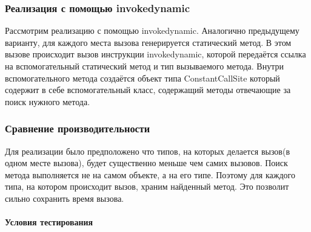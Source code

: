 \subsubsection{Реализация с помощью invokedynamic}
Рассмотрим реализацию с помощью invokedynamic. Аналогично предыдущему варианту, для каждого места вызова генерируется статический метод. В этом вызове происходит вызов инструкции invokedynamic, которой передаётся ссылка на вспомогательный статический метод и тип вызываемого метода. Внутри вспомогательного метода создаётся объект типа ConstantCallSite который содержит в себе вспомогательный класс, содержащий методы отвечающие за поиск нужного метода.

\subsubsection{Сравнение производительности}

Для реализации было предположено что типов, на которых делается вызов(в одном месте вызова), будет существенно меньше чем самих вызовов. Поиск метода выполняется не на самом объекте, а на его типе. Поэтому для каждого типа, на котором происходит вызов, храним найденный метод. Это позволит сильно сохранить время вызова.

\paragraph{Условия тестирования}